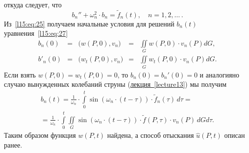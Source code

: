 откуда следует, что 
\begin{equation}\label{l15:eq:27}
	 b_n''+\omega_n^2\cdot b_n=\widetilde{f}_n(t),\quad n=1,2,\ldots\,.
\end{equation}
Из~\eqref{l15:eq:25} получаем начальные условия для решений $b_n(t)$ уравнения~\eqref{l15:eq:27}
\begin{equation*}
	\begin{array}{rcccl}
		b_n(0)&=&\big(w(P,0),v_n\big)&=&\displaystyle\iint\limits_{G}w(P,0)\cdot v_n(P)dG,\\
		b'_n(0)&=&\big(w_t(P,0),v_n\big)&=&\displaystyle\iint\limits_{G}w_t(P,0)\cdot v_n(P)dG.
	\end{array}
\end{equation*}
Если взять $w(P,0)=w_t(P,0)=0$, то $b_n(0)=b_n'(0)=0$ и аналогияно случаю вынужденных колебаний струны (\hyperref[lecture13]{лекция~\ref{lecture13}}) мы получим 
\begin{multline*}
	 b_n(t)=\frac{1}{\omega_n}\cdot\int\limits_0^t\sin\left(\omega_n\cdot(t-\tau)\right)\cdot\widetilde{f}_n(\tau)\,d\tau=\\=\frac{1}{\omega_n}\cdot\int\limits_0^t\iint\limits_{G}\sin\left(\omega_n\cdot(t-\tau)\right)\cdot\widetilde{f}(P,\tau)\cdot v_n(P)\,dGd\tau.
\end{multline*}
Таким образом функция $w(P,t)$ найдена, а способ отыскания $\widehat{u}(P,t)$ описан ранее.